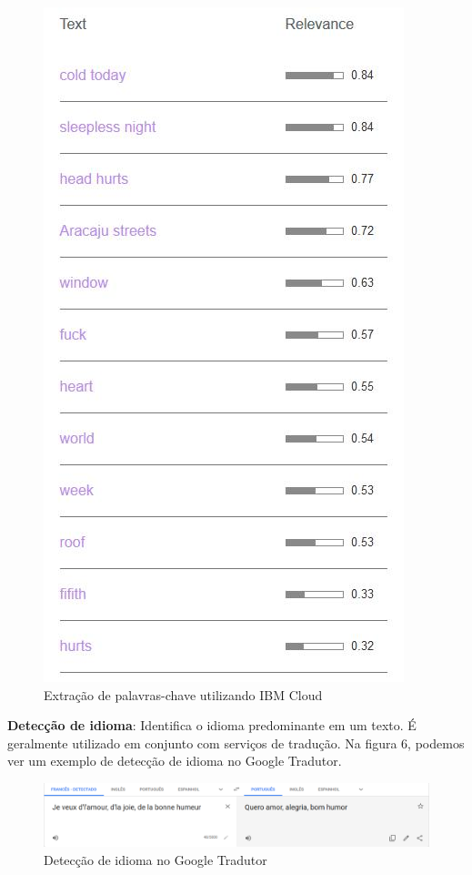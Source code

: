 \documentclass{article}
\begin{document}
\begin{figure}[H]
    \centering
    \includegraphics[scale=0.5]{imagens/nlp_extracao_keywords.jpg}
    \caption{Extração de palavras-chave utilizando IBM Cloud}
    \label{fig:nlp_keywords}
\end{figure}{}
\textbf{Detecção de idioma}: Identifica o idioma predominante em um texto. É geralmente utilizado em conjunto com serviços de tradução. Na figura 6, podemos ver um exemplo de detecção de idioma no Google Tradutor. \\
\begin{figure}[H]
    \centering
    \includegraphics[scale=0.3]{imagens/deteccao_idioma.png}
    \caption{Detecção de idioma no Google Tradutor}
    \label{fig:deteccao_idioma}
\end{figure}{}
\end{document}
